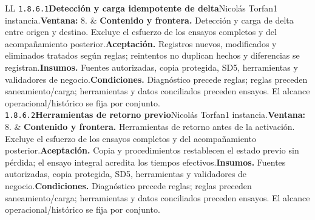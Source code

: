 \begin{longtable}{L{\tabcolsep\relax}L{\tabcolsep\relax}}
\texttt{1.\allowbreak{}8.\allowbreak{}6.\allowbreak{}1}\newline{}\textbf{Detección y carga idempotente de delta}\newline{}Nicolás Torfan\newline{}1 instancia.\newline{}\textbf{Ventana:} 8. & \textbf{Contenido y frontera.} Detección y carga de delta entre origen y destino. Excluye el esfuerzo de los ensayos completos y del acompañamiento posterior.\newline{}\textbf{Aceptación.} Registros nuevos, modificados y eliminados tratados según reglas; reintentos no duplican hechos y diferencias se registran.\newline{}\textbf{Insumos.} Fuentes autorizadas, copia protegida, SD5, herramientas y validadores de negocio.\newline{}\textbf{Condiciones.} Diagnóstico precede reglas; reglas preceden saneamiento/carga; herramientas y datos conciliados preceden ensayos. El alcance operacional/histórico se fija por conjunto.\\\hline
\texttt{1.\allowbreak{}8.\allowbreak{}6.\allowbreak{}2}\newline{}\textbf{Herramientas de retorno previo}\newline{}Nicolás Torfan\newline{}1 instancia.\newline{}\textbf{Ventana:} 8. & \textbf{Contenido y frontera.} Herramientas de retorno antes de la activación. Excluye el esfuerzo de los ensayos completos y del acompañamiento posterior.\newline{}\textbf{Aceptación.} Copia y procedimientos restablecen el estado previo sin pérdida; el ensayo integral acredita los tiempos efectivos.\newline{}\textbf{Insumos.} Fuentes autorizadas, copia protegida, SD5, herramientas y validadores de negocio.\newline{}\textbf{Condiciones.} Diagnóstico precede reglas; reglas preceden saneamiento/carga; herramientas y datos conciliados preceden ensayos. El alcance operacional/histórico se fija por conjunto.\\\hline

\end{longtable}
